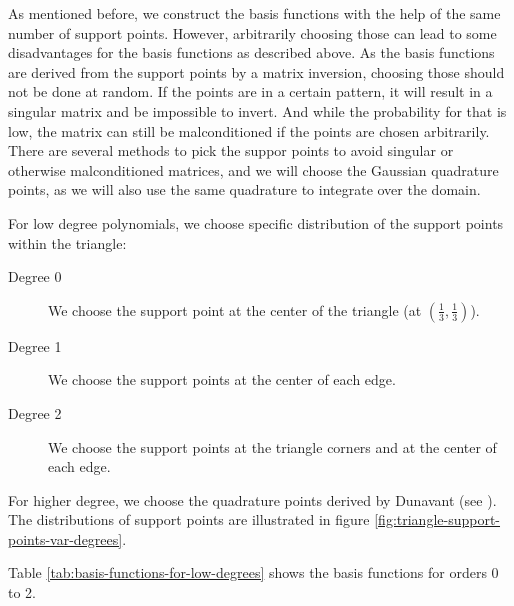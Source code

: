 \documentclass{article}
\begin{document}
As mentioned before, we construct the basis functions with the help of the same number of support points. However, arbitrarily choosing those can lead to some disadvantages for the basis functions as described above. As the basis functions are derived from the support points by a matrix inversion, choosing those should not be done at random. If the points are in a certain pattern, it will result in a singular matrix and be impossible to invert. And while the probability for that is low, the matrix can still be malconditioned if the points are chosen arbitrarily. There are several methods to pick the suppor points to avoid singular or otherwise malconditioned matrices, and we will choose the Gaussian quadrature points, as we will also use the same quadrature to integrate over the domain.

For low degree polynomials, we choose specific distribution of the support points within the triangle:
\begin{description}
\item[Degree 0] We choose the support point at the center of the triangle (at $\left(\frac{1}{3}, \frac{1}{3}\right)$).
\item[Degree 1] We choose the support points at the center of each edge.
\item[Degree 2] We choose the support points at the triangle corners and at the center of each edge.
\end{description}

For higher degree, we choose the quadrature points derived by Dunavant (see \cite{dunavant1985high}). The distributions of support points are illustrated in figure \ref{fig:triangle-support-points-var-degrees}.

Table \ref{tab:basis-functions-for-low-degrees} shows the basis functions for orders 0 to 2.
\end{document}
